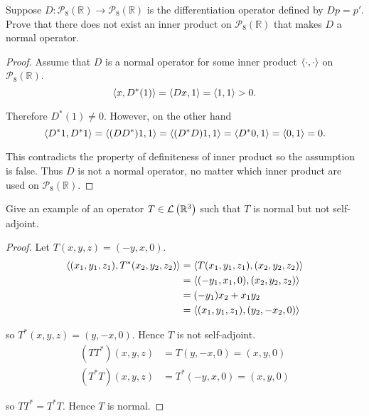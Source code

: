 \begin{exercise}
    Suppose $D: \mathscr{P}_{8}(\mathbb{R}) \to \mathscr{P}_{8}(\mathbb{R})$ is the differentiation operator defined by $Dp = p'$. Prove that there does not exist an inner product on $\mathscr{P}_{8}(\mathbb{R})$ that makes $D$ a normal operator.
\end{exercise}

\begin{proof}
    Assume that $D$ is a normal operator for some inner product $\left\langle{\cdot, \cdot}\right\rangle$ on $\mathscr{P}_{8}(\mathbb{R})$.
    \[
        \left\langle{x, D^{*}(1)}\right\rangle = \left\langle{Dx, 1}\right\rangle = \left\langle{1, 1}\right\rangle > 0.
    \]

    Therefore $D^{*}(1)\ne 0$. However, on the other hand
    \[
        \left\langle{D^{*}1, D^{*}1}\right\rangle = \left\langle{(DD^{*})1, 1}\right\rangle = \left\langle{(D^{*}D)1, 1}\right\rangle = \left\langle{D^{*}0, 1}\right\rangle = \left\langle{0, 1}\right\rangle = 0.
    \]

    This contradicts the property of definiteness of inner product so the assumption is false. Thus $D$ is not a normal operator, no matter which inner product are used on $\mathscr{P}_{8}(\mathbb{R})$.
\end{proof}
\newpage

\begin{exercise}
    Give an example of an operator $T\in\mathcal{L}\left({\mathbb{R}^{3}}\right)$ such that $T$ is normal but not self-adjoint.
\end{exercise}

\begin{proof}
    Let $T(x, y, z) = (-y, x, 0)$.
    \begin{align*}
        \left\langle{(x_{1}, y_{1}, z_{1}), T^{*}(x_{2}, y_{2}, z_{2})}\right\rangle & = \left\langle{T(x_{1}, y_{1}, z_{1}), (x_{2}, y_{2}, z_{2})}\right\rangle \\
                                                                      & = \left\langle{(-y_{1}, x_{1}, 0), (x_{2}, y_{2}, z_{2})}\right\rangle     \\
                                                                      & = (-y_{1})x_{2} + x_{1}y_{2}                                \\
                                                                      & = \left\langle{(x_{1}, y_{1}, z_{1}), (y_{2}, -x_{2}, 0)}\right\rangle
    \end{align*}

    so $T^{*}(x, y, z) = (y, -x, 0)$. Hence $T$ is not self-adjoint.
    \begin{align*}
        (TT^{*})(x, y, z) & = T(y, -x, 0) = (x, y, 0)     \\
        (T^{*}T)(x, y, z) & = T^{*}(-y, x, 0) = (x, y, 0)
    \end{align*}

    so $TT^{*} = T^{*}T$. Hence $T$ is normal.
\end{proof}
\newpage

